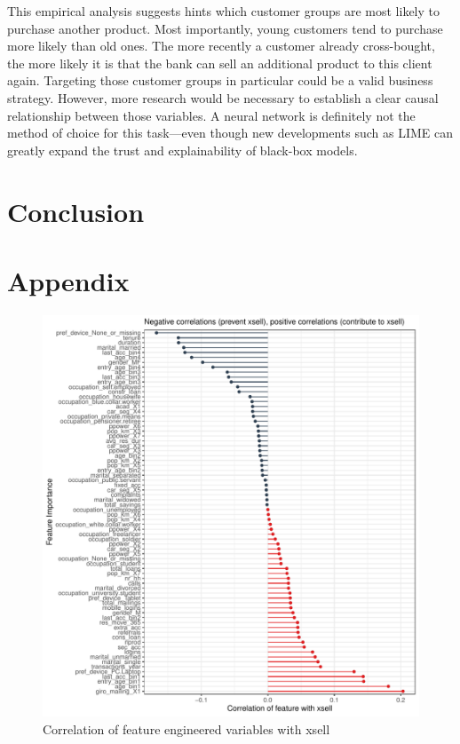 \documentclass[12pt,a4paper]{article}
\begin{document}
This empirical analysis suggests hints which customer groups are most likely to purchase another product.
Most importantly, young customers tend to purchase more likely than old ones. The more recently a customer already cross-bought,
the more likely it is that the bank can sell an additional product to this client again.
Targeting those customer groups in particular could be a valid business strategy.
However, more research would be necessary to establish a clear causal relationship between those variables.
A neural network is definitely not the method of choice for this task---even though new developments such as LIME can greatly expand the trust and explainability of black-box models.

\section{Conclusion}




\clearpage
\appendix
\section{Appendix}
\begin{figure}[ht]
	\centering
  \includegraphics[scale=0.8]{figures/corrplot.pdf}
	\caption{Correlation of feature engineered variables with xsell}
	\label{fig_corr}
\end{figure}
\end{document}

